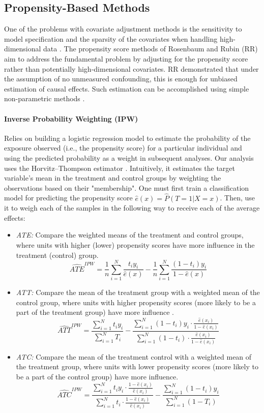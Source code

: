 \documentclass{article}
\begin{document}
\subsection{Propensity-Based Methods}

One of the problems with covariate adjustment methods is the sensitivity to model specification and the sparsity of the covariates when handling high-dimensional data \citep{zhao2020propensity}. The propensity score methods of Rosenbaum and Rubin (RR) aim to address the fundamental problem by adjusting for the propensity score rather than potentially high-dimensional covariates. RR demonstrated that under the assumption of no unmeasured confounding, this is enough for unbiased estimation of causal effects. Such estimation can be accomplished using simple non-parametric methods \citep{abdia2017propensity}.

\paragraph{Inverse Probability Weighting (IPW)} Relies on building a logistic regression model to estimate the probability of the exposure observed (i.e., the propensity score) for a particular individual and using the predicted probability as a weight in subsequent analyses. Our analysis uses the Horvitz–Thompson estimator \citep{horvitz1952generalization}. Intuitively, it estimates the target variable's mean in the treatment and control groups by weighting the observations based on their "membership". One must first train a classification model for predicting the propensity score $\hat e(x) = \hat P(T=1 | X=x)$. Then, use it to weigh each of the samples in the following way to receive each of the average effects:

\begin{itemize}
    \item \textit{ATE:} Compare the weighted means of the treatment and control groups, where units with higher (lower) propensity scores have more influence in the treatment (control) group.
    \[
    \widehat{ATE}^{IPW} = \frac{1}{n}\sum_{i=1}^N \frac{t_i y_i}{\hat e(x)} - \frac{1}{n}\sum_{i=1}^N \frac{(1-t_i)y_i}{1-\hat e(x)}
    \]

    \item \textit{ATT:} Compare the mean of the treatment group with a weighted mean of the control group, where units with higher propensity scores (more likely to be a part of the treatment group) have more influence \citep{lechner2001identification}.
    \[
    \widehat{ATT}^{IPW} = \frac{\sum_{i=1}^N t_i y_i}{\sum_{i=1}^N T_i} - \frac{\sum_{i=1}^N (1-t_i)y_i \cdot \frac{\hat e(x_i)}{1- \hat e(x_i)}}{\sum_{i=1}^N (1-t_i) \cdot \frac{\hat e(x_i)}{1-\hat e(x_i)}}
    \]
    \item \textit{ATC:} Compare the mean of the treatment control with a weighted mean of the treatment group, where units with lower propensity scores (more likely to be a part of the control group) have more influence.
    \[
    \widehat{ATC}^{IPW} = \frac{\sum_{i=1}^N t_iy_i \cdot \frac{1-\hat e(x_i)}{\hat e(x_i)}}{\sum_{i=1}^N t_i \cdot \frac{1-\hat e(x_i)}{\hat e(x_i)}} - \frac{\sum_{i=1}^N (1-t_i)y_i}{\sum_{i=1}^N (1-T_i)}
    \]
\end{itemize}
\end{document}
